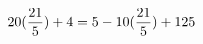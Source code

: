 \documentclass[preview]{standalone}
\begin{document}
\begin{align*}
\special{dvisvgm:raw <g id='unique000'>}20(\frac{21}{5}) + 4 = 5 - 10(\frac{21}{5}) + 125\special{dvisvgm:raw </g>}
\end{align*}
\end{document}
